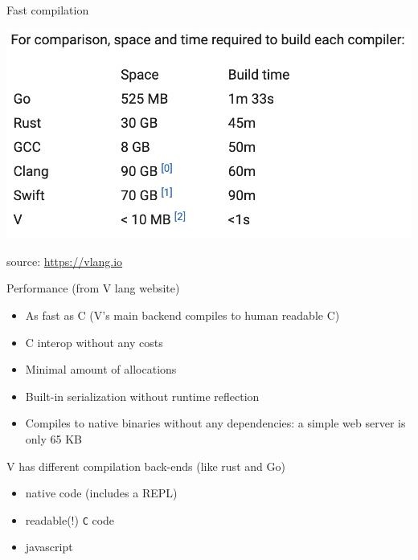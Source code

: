 \documentclass[
  ignorenonframetext,
]{beamer}
\providecommand{\tightlist}{%
  \setlength{\itemsep}{0pt}\setlength{\parskip}{0pt}}
\begin{document}
\begin{frame}{Fast compilation}
\protect\hypertarget{fast-compilation}{}
\begin{centering}
  \includegraphics[width=0.8\paperwidth]{img/compilation}
  \par
\end{centering}

\tiny source: \url{https://vlang.io}
\end{frame}

\begin{frame}[fragile]{Performance (from V lang website)}
\protect\hypertarget{performance-from-v-lang-website}{}
\begin{itemize}
\tightlist
\item
  As fast as C (V's main backend compiles to human readable C)
\item
  C interop without any costs
\item
  Minimal amount of allocations
\item
  Built-in serialization without runtime reflection
\item
  Compiles to native binaries without any dependencies: a simple web
  server is only 65 KB
\end{itemize}

\begin{block}{V has different compilation back-ends (like rust and Go)}
\protect\hypertarget{v-has-different-compilation-back-ends-like-rust-and-go}{}
\begin{itemize}
\tightlist
\item
  native code (includes a REPL)
\item
  readable(!) \texttt{C} code
\item
  javascript
\end{itemize}
\end{block}
\end{frame}
\end{document}
